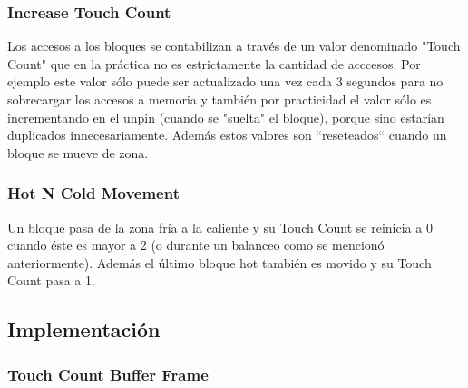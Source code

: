 \subsubsection{Increase Touch Count }

Los accesos a los bloques se contabilizan a través de un valor denominado "Touch Count" que en la práctica no es estrictamente la 
cantidad de acccesos. Por ejemplo este valor sólo puede ser actualizado una vez cada 3 segundos para no sobrecargar los accesos a memoria y también por practicidad el valor sólo es incrementando en el unpin (cuando se "suelta" el bloque), porque sino estarían duplicados innecesariamente. Además estos valores son ``reseteados`` cuando un bloque se mueve de zona.\\


\subsubsection{Hot N Cold Movement}

Un bloque pasa de la zona fría a la caliente y su Touch Count se reinicia a 0 cuando éste es mayor a 2 (o durante un balanceo como se mencionó anteriormente). Además el último bloque hot también es movido y su Touch Count pasa a 1.\\

\subsection{Implementación}
\subsubsection{Touch Count Buffer Frame}

